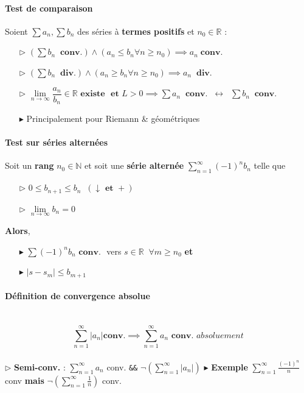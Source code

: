 \documentclass{report}
\begin{document}
\begin{multicols*}{3}
    
     \paragraph{Test de comparaison}
     Soient $\sum a_n, \sum b_n$ des séries à \textbf{termes positifs} 
     et $n_0 \in \mathbb{R}$ :
     \begin{itemize}
         \item[$\rhd$ ] $\left(\sum   b_n  \;\; \textbf{conv.}\right) \land 
             (a_n \leq b_n \forall n \geq n_0) 
             \implies a_n \; \textbf{conv.}$ 
         \item[$\rhd$ ] $\left(\sum   b_n  \;\; \textbf{div.}\right) \land 
             (a_n \geq b_n \forall n \geq n_0) 
             \implies a_n \;\; \textbf{div.}$ 
         \item[$\rhd$ ] $\lim\limits_{n\to\infty}\dfrac{a_n}{b_n}
             \in \mathbb{R} \textbf{ existe } \textbf{ et } L > 0 
             \implies 
        \sum a_n \;\; \textbf{conv.} \;\; \leftrightarrow \;\; 
        \sum b_n \;\; \textbf{conv.}$ 
    \item[$\blacktriangleright$] Principalement pour Riemann \& géométriques
     \end{itemize}

     

     \paragraph{Test sur séries alternées}
     Soit un \textbf{rang} $n_0 \in \mathbb{N}$ et 
     soit une \textbf{série alternée} 
     $\sum_{n=1}^{\infty } (-1)^nb_n$ telle que 
     \begin{itemize}
        \item[$\rhd$]  $0 \leq b_{n+1} \leq b_n \;\;(\downarrow \textbf{ et } +)$ 
        \item[$\rhd$] $\lim\limits_{n\to\infty }b_n = 0$ 
     \end{itemize}
     \textbf{Alors}, 
     \begin{itemize}
         \item[$\blacktriangleright$]
     $\sum  (-1)^nb_n \textbf{ conv. }$ vers $s \in
     \mathbb{R} \;\; \forall 
     m \geq n_0 $ \textbf{et}  
        \item[$\blacktriangleright$] 
    $|s - s_m| \leq b_{m+1}$
     \end{itemize}

  \paragraph{Définition de convergence absolue}
     \mbox{}\\
     \[ \sum_{n=1}^{\infty }|a_n| \textbf{conv.} \implies \sum_{n=1}^{\infty }a_n  
     \textbf{ conv. } \textit{absoluement} \]
      \\
      $\rhd$  \textbf{Semi-conv.} : $\sum_{n=1}^{\infty }a_n$ conv. 
         \texttt{\&\&} $\neg(\sum_{n=1}^{\infty }|a_n|)$ 
      $\blacktriangleright$  \textbf{Exemple} $\sum_{n=1}^{\infty }\frac{(-1)^n}{n}$ conv 
          \textbf{mais} $\neg(\sum_{n=1}^{\infty }\frac{1}{n})$ conv.  


\end{multicols*}
\end{document}
